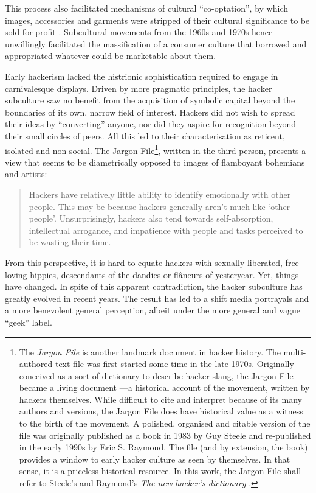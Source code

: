 This process also facilitated mechanisms of cultural ``co-optation'', by which images, accessories and garments were stripped of their cultural significance to be sold for profit \citep{heath05}. Subcultural movements from the 1960s and 1970s hence unwillingly facilitated the massification of a consumer culture that borrowed and appropriated whatever could be marketable about them. 

Early hackerism lacked the histrionic sophistication required to engage in carnivalesque displays. Driven by more pragmatic principles, the hacker subculture saw no benefit from the acquisition of symbolic capital beyond the boundaries of its own, narrow field of interest. Hackers did not wish to spread their ideas by ``converting'' anyone, nor did they aspire for recognition beyond their small circles of peers. All this led to their characterisation as reticent, isolated and non-social. The Jargon File\footnote{The \textit{Jargon File} is another landmark document in hacker history. The multi-authored text file was first started some time in the late 1970s. Originally conceived as a sort of dictionary to describe hacker slang, the Jargon File became a living document ---a historical account of the movement, written by hackers themselves. While difficult to cite and interpret because of its many authors and versions, the Jargon File does have historical value as a witness to the birth of the movement. A polished, organised and citable version of the file was originally published as a book in 1983 by Guy Steele and re-published in the early 1990s by Eric S. Raymond. The file (and by extension, the book) provides a window to early hacker culture as seen by themselves. In that sense, it is a priceless historical resource. In this work, the Jargon File shall refer to Steele's and Raymond's \textit{The new hacker's dictionary} \citeyearpar{raymond93}.}, written in the third person, presents a view that seems to be diametrically opposed to images of flamboyant bohemians and artists:

\begin{quote}
Hackers have relatively little ability to identify emotionally with other people. This may be because hackers generally aren't much like `other people'. Unsurprisingly, hackers also tend towards self-absorption, intellectual arrogance, and impatience with people and tasks perceived to be wasting their time. \citep[p.743]{raymond93}
\end{quote}

From this perspective, it is hard to equate hackers with sexually liberated, free-loving hippies, descendants of the dandies or fl\^{a}neurs of yes\-ter\-year. Yet, things have changed. In spite of this apparent contradiction, the hacker subculture has greatly evolved in recent years. The result has led to a shift media portrayals and a more benevolent general perception, albeit under the more general and vague ``geek'' label.

